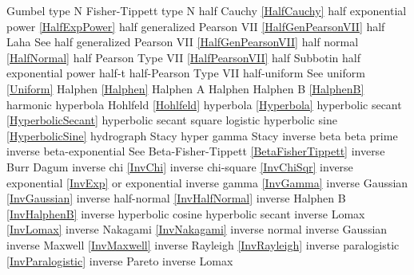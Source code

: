 Gumbel type N 					\dotfill	Fisher-Tippett type N 				\ncite	%
%
half Cauchy						\dotfill	\eqref{HalfCauchy}					\ncite	%
half exponential power			\dotfill	\eqref{HalfExpPower}				\ncite	%
half generalized Pearson VII	\dotfill	\eqref{HalfGenPearsonVII}			\ncite	%
half Laha						\dotfill	See half generalized Pearson VII \eqref{HalfGenPearsonVII}	\mcite{\self}	%
half normal 					\dotfill	\eqref{HalfNormal}					\ncite	%
half Pearson Type VII			\dotfill	\eqref{HalfPearsonVII} 				\ncite	%
half Subbotin					\dotfill	half exponential power				\ncite	%
half-t							\dotfill	half-Pearson Type VII				\ncite	%
half-uniform 					\dotfill	See uniform \eqref{Uniform} 		\ncite	%
Halphen							\dotfill	\eqref{Halphen}						\ncite
Halphen A						\dotfill	Halphen								\ncite
Halphen B						\dotfill	\eqref{HalphenB}					\ncite
harmonic						\dotfill	hyperbola							\ncite
Hohlfeld						\dotfill	\eqref{Hohlfeld}					\mcite{\self}	%
hyperbola						\dotfill	\eqref{Hyperbola}					\ncite	
hyperbolic secant 				\dotfill	\eqref{HyperbolicSecant}			\ncite	%
hyperbolic secant square		\dotfill	logistic 							\ncite	%
hyperbolic sine					\dotfill	\eqref{HyperbolicSine}				\mcite{\self}	%
hydrograph						\dotfill	Stacy 								\ncite	%
hyper gamma   					\dotfill	Stacy								\ncite	%
%
inverse beta					\dotfill	beta prime 							\ncite	%
inverse beta-exponential 		\dotfill	See Beta-Fisher-Tippett \eqref{BetaFisherTippett}\ncite
inverse Burr					\dotfill	Dagum 								\ncite	%
inverse chi  					\dotfill	\eqref{InvChi}						\ncite	%
inverse chi-square 				\dotfill	\eqref{InvChiSqr}					\ncite	%
inverse exponential 			\dotfill	\eqref{InvExp} or exponential		\ncite	%
inverse gamma 					\dotfill	\eqref{InvGamma}					\ncite	%
inverse Gaussian				\dotfill	\eqref{InvGaussian}					\ncite	%
inverse half-normal				\dotfill	\eqref{InvHalfNormal}				\ncite
inverse Halphen B				\dotfill	\eqref{InvHalphenB}					\ncite	
inverse hyperbolic cosine		\dotfill	hyperbolic secant 					\ncite	%
inverse Lomax					\dotfill	\eqref{InvLomax}					\ncite	%
inverse Nakagami				\dotfill	\eqref{InvNakagami}					
inverse normal					\dotfill	inverse Gaussian					\ncite	%
inverse Maxwell					\dotfill	\eqref{InvMaxwell}					
inverse Rayleigh  				\dotfill	\eqref{InvRayleigh}					\ncite	%
inverse paralogistic			\dotfill	\eqref{InvParalogistic} 			\ncite	%
inverse Pareto					\dotfill	inverse Lomax 						\ncite 	%
